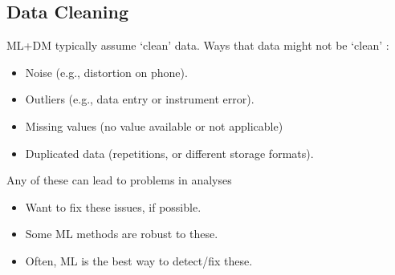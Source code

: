 \documentclass{article}
\begin{document}
\subsection*{Data Cleaning}
ML+DM typically assume ‘clean’ data. Ways that data might not be ‘clean’ : 
\begin{itemize}
	\item Noise (e.g., distortion on phone).
	\item Outliers (e.g., data entry or instrument error).
	\item Missing values (no value available or not applicable)
	\item Duplicated data (repetitions, or different storage formats).
\end{itemize}
Any of these can lead to problems in analyses
\begin{itemize}
	\item Want to fix these issues, if possible.
	\item Some ML methods are robust to these.
	\item Often, ML is the best way to detect/fix these.
\end{itemize}
\end{document}
